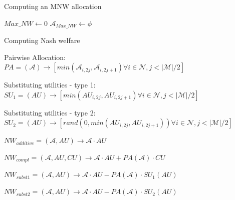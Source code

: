 \begin{algorithm}
\caption{ Computing an MNW allocation }
\label{algorithm1}
\SetAlgoLined
{}
 $Max\_NW \leftarrow 0 $ \;
 $\mathcal{A}_{Max\_NW} \leftarrow \phi $ \;
\end{algorithm}

\begin{algorithm}
\caption{ Computing Nash welfare }
\label{algorithm2}
\SetAlgoLined

Pairwise Allocation: \\
$ PA = (\mathcal{A}) \rightarrow [min(\mathcal{A}_{i,2j}, \mathcal{A}_{i,2j+1}) \forall i \in \mathcal{N}, j < |\mathcal{M}|/2] $

\BlankLine

Substituting utilities - type 1: \\
$ SU_1 = (AU) \rightarrow [min(AU_{i,2j}, AU_{i,2j+1}) \forall i \in \mathcal{N}, j < |\mathcal{M}|/2] $

\BlankLine

Substituting utilities - type 2: \\
$ SU_2 = (AU) \rightarrow [rand(0, min(AU_{i,2j}, AU_{i,2j+1})) \forall i \in \mathcal{N}, j < |\mathcal{M}|/2] $

\BlankLine
\BlankLine

$ NW_{additive} = (\mathcal{A}, AU) \rightarrow \mathcal{A} \cdot AU $

$ NW_{compl} = (\mathcal{A}, AU, CU) \rightarrow \mathcal{A} \cdot AU + PA(\mathcal{A}) \cdot CU $

$ NW_{subst1} = (\mathcal{A}, AU) \rightarrow \mathcal{A} \cdot AU - PA(\mathcal{A}) \cdot SU_1(AU) $

$ NW_{subst2} = (\mathcal{A}, AU) \rightarrow \mathcal{A} \cdot AU - PA(\mathcal{A}) \cdot SU_2(AU) $

\end{algorithm}

